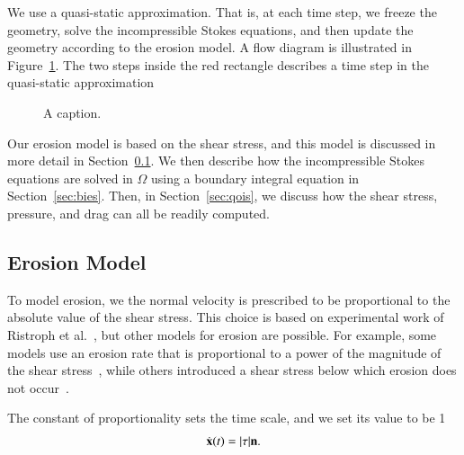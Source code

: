 \documentclass[preprint, 10pt]{elsarticle}
\begin{document}
We use a quasi-static approximation.  That is, at each time step, we
freeze the geometry, solve the incompressible Stokes equations, and then
update the geometry according to the erosion model.  A flow diagram is
illustrated in Figure~\ref{fig:workflow}.  The two steps inside the red
rectangle describes a time step in the quasi-static approximation
\begin{figure}[htpb]
  \centering
  
  \caption{\label{fig:workflow}A caption.}
\end{figure}

Our erosion model is based on the shear stress, and this model is
discussed in more detail in Section~\ref{sec:erosion}.  We then describe
how the incompressible Stokes equations are solved in $\Omega$ using a
boundary integral equation in Section~\ref{sec:bies}.  Then, in
Section~\ref{sec:qois}, we discuss how the shear stress, pressure, and
drag can all be readily computed.  


\subsection{Erosion Model} 
\label{sec:erosion}

To model erosion, we the normal velocity is prescribed to be
proportional to the absolute value of the shear stress.  This choice is
based on experimental work of Ristroph et
al.~\cite{ris-moo-chi-she-zha2012}, but other models for erosion are
possible.  For example, some models use an erosion rate that is
proportional to a power of the magnitude of the shear
stress~\cite{par-izu2000}, while others introduced a shear stress below
which erosion does not occur~\cite{lag2000}.

The constant of proportionality sets the time scale, and we set its
value to be 1
\begin{align}
  \dot{{\mathbf{x}}}(t) = \lvert \tau \rvert {\mathbf{n}}.
  \label{eqn:bodyEvolution}
\end{align}

\cite{moo-ris-chi-zha-she2013}


\end{document}
